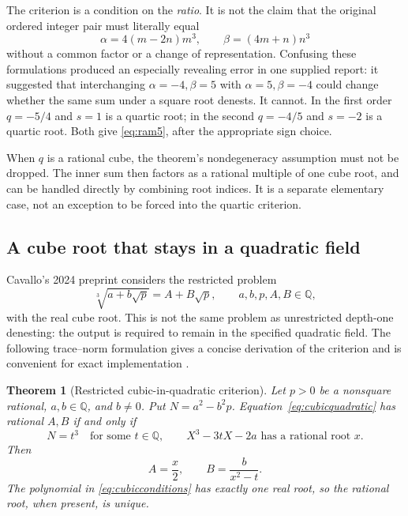 \documentclass[11pt,oneside]{article}
\numberwithin{equation}{section}
\newtheorem{theorem}{Theorem}[section]
\theoremstyle{definition}
\theoremstyle{remark}
\newcommand{\Q}{\mathbb{Q}}
\begin{document}
The criterion is a condition on the \emph{ratio}. It is not the claim that the original ordered integer pair must literally equal
\[
\alpha=4(m-2n)m^3,
\qquad \beta=(4m+n)n^3
\]
without a common factor or a change of representation. Confusing these formulations produced an especially revealing error in one supplied report: it suggested that interchanging $\alpha=-4,\beta=5$ with $\alpha=5,\beta=-4$ could change whether the same sum under a square root denests. It cannot. In the first order $q=-5/4$ and $s=1$ is a quartic root; in the second $q=-4/5$ and $s=-2$ is a quartic root. Both give \eqref{eq:ram5}, after the appropriate sign choice.

When $q$ is a rational cube, the theorem's nondegeneracy assumption must not be dropped. The inner sum then factors as a rational multiple of one cube root, and can be handled directly by combining root indices. It is a separate elementary case, not an exception to be forced into the quartic criterion.

\subsection{A cube root that stays in a quadratic field}\label{sec:cubicquadratic}
Cavallo's 2024 preprint considers the restricted problem
\begin{equation}\label{eq:cubicquadratic}
\sqrt[3]{a+b\sqrt p}=A+B\sqrt p,
\qquad a,b,p,A,B\in\Q,
\end{equation}
with the real cube root. This is not the same problem as unrestricted depth-one denesting: the output is required to remain in the specified quadratic field. The following trace--norm formulation gives a concise derivation of the criterion and is convenient for exact implementation \cite{cavallo}.

\begin{theorem}[Restricted cubic-in-quadratic criterion]\label{thm:cubicquadratic}
Let $p>0$ be a nonsquare rational, $a,b\in\Q$, and $b\ne0$. Put $N=a^2-b^2p$. Equation~\eqref{eq:cubicquadratic} has rational $A,B$ if and only if
\begin{equation}\label{eq:cubicconditions}
N=t^3\quad\text{for some }t\in\Q,
\qquad X^3-3tX-2a\text{ has a rational root }x.
\end{equation}
Then
\begin{equation}\label{eq:cubicAB}
A=\frac{x}{2},\qquad B=\frac{b}{x^2-t}.
\end{equation}
The polynomial in \eqref{eq:cubicconditions} has exactly one real root, so the rational root, when present, is unique.
\end{theorem}
\end{document}
